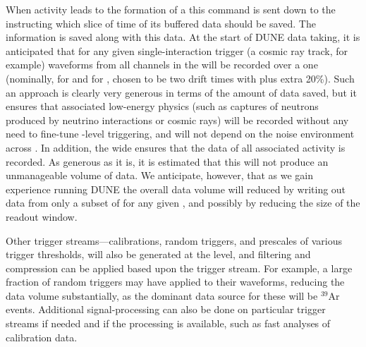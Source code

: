 When activity leads to the formation of a  this
command is sent down to the  instructing which slice of
time of its buffered data should be saved. 
The  information is saved along with this data. 
At the start of DUNE data taking, it is anticipated that for any given
single-interaction trigger (a cosmic ray track, for example) waveforms
from all channels in the  will be recorded over a one
 (nominally, \spreadout for  and
\dpreadout for , chosen to be two drift times with plus
extra 20\%). 
Such an approach is clearly very generous in terms of the amount of
data saved, but it ensures that associated low-energy physics (such as
captures of neutrons produced by neutrino interactions or cosmic rays)
will be recorded without any need to fine-tune -level
triggering, and will not depend on the noise environment across
. 
In addition, the wide  ensures that the data of
all associated activity is recorded.
As generous as it is, it is estimated that this 
will not produce an unmanageable volume of data. 
We anticipate, however, that as we gain experience running DUNE the
overall data volume will reduced by writing out data from only a
subset of  for any given , and possibly
by reducing the size of the readout window.

Other trigger streams---calibrations, random triggers, and prescales
of various trigger thresholds, will also be generated at the
 level, and filtering and compression can be applied
based upon the trigger stream. 
For example, a large fraction of random triggers may have 
applied to their waveforms, reducing the data volume substantially, as
the dominant data source for these will be $^{39}$Ar events.
Additional signal-processing can also be done on particular trigger
streams if needed and if the processing is available, such as fast
analyses of calibration data.

